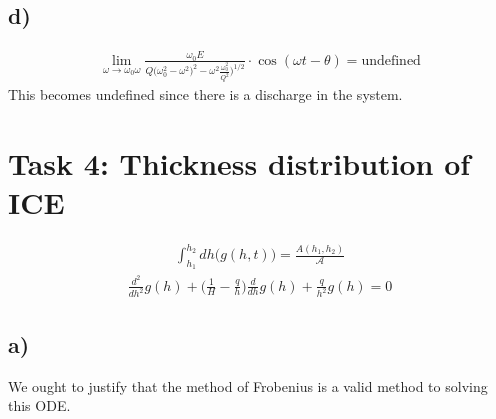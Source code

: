 \documentclass{article}
\begin{document}
\subsection*{d)}
\begin{align*}
    \lim_{\omega\to\omega_0\omega}\frac{\omega_0E}{Q\Big(\omega_0^2-\omega^2)^2 - \omega^2 \frac{\omega_0^2}{Q^2}\Big)^{1/2}}\cdot\cos(\omega t - \theta) = \text{undefined}
\end{align*}This becomes undefined since there is a discharge in the system.
\section*{Task 4: Thickness distribution of ICE}
\begin{align}
    \int_{h_1}^{h_2}dh\Big(g(h,t)\Big) = \frac{A(h_1, h_2)}{\mathcal{A}}
\end{align}
\begin{align}
    \frac{d^2}{dh^2}g(h) + \Big(\frac{1}{H} - \frac{q}{h}\Big)\frac{d}{dh}g(h)+\frac{q}{h^2}g(h) = 0\label{exp: task4}
\end{align}
\subsection*{a)}
We ought to justify that the method of Frobenius is a valid method to solving this ODE.
\end{document}
